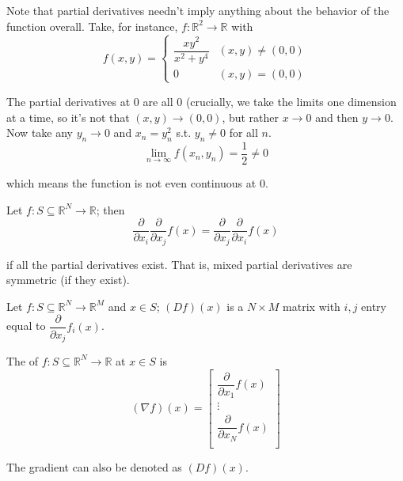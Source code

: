 \documentclass{article}
\begin{document}
%

Note that partial derivatives needn't imply anything about the behavior of the function overall. Take, for instance, $f: \mathbb{R}^2 \to \mathbb{R}$ with
\[
  f(x, y) =
  \begin{cases}
    \dfrac{xy^2}{x^2 + y^4} & (x, y) \ne (0, 0) \\
    0 & (x, y) = (0, 0)
  \end{cases}
\]

The partial derivatives at $0$ are all $0$ (crucially, we take the limits one dimension at a time, so it's not that $(x, y) \to (0, 0)$, but rather $x \to 0$ and then $y \to 0$. Now take any $y_n \to 0$ and $x_n = y_n^2$ s.t. $y_n \ne 0$ for all $n$.
\[
  \lim_{n \to \infty} f(x_n, y_n) = \dfrac{1}{2} \ne 0
\]

which means the function is not even continuous at $0$.

\begin{theorem}
  Let $f: S \subseteq \mathbb{R}^N \to \mathbb{R}$; then
  \[
    \dfrac{\partial}{\partial x_i} \dfrac{\partial}{\partial x_j} f(x)
    =
    \dfrac{\partial}{\partial x_j} \dfrac{\partial}{\partial x_i} f(x)
  \]

  if all the partial derivatives exist. That is, mixed partial derivatives are symmetric (if they exist).
\end{theorem}

\begin{definition}
  Let $f: S \subseteq \mathbb{R}^N \to \mathbb{R}^M$ and $x \in S$; $(Df)(x)$ is a $N \times M$ matrix with $i, j$ entry equal to $\dfrac{\partial}{\partial x_j} f_i(x)$.
\end{definition}

\begin{definition}
  The  of $f: S \subseteq \mathbb{R}^N \to \mathbb{R}$ at $x \in S$ is
  \[
    (\nabla f)(x) = \left[\begin{matrix}
      \dfrac{\partial}{\partial x_1} f(x) \\
      \vdots \\
      \dfrac{\partial}{\partial x_N} f(x) \\
    \end{matrix}\right]
  \]

  The gradient can also be denoted as $(Df)(x)$.
\end{definition}
\end{document}
